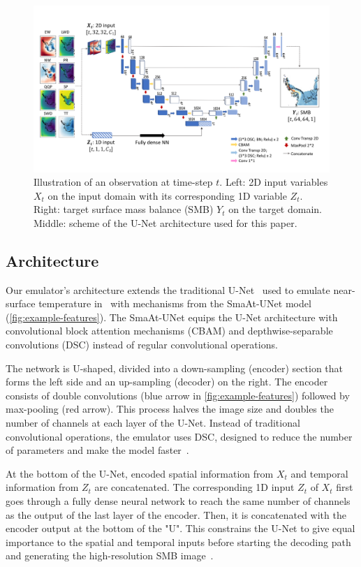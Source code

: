 \documentclass[a4paper,11pt,oneside]{report}
\begin{document}
\begin{figure}[!t]
  \centering
  \includegraphics[width=\columnwidth]{doc/Thesis-latex/images/unet-with-data.pdf}
  \caption []{\small Illustration of an observation at time-step $t$. Left: 2D input variables $X_t$ on the input domain with its corresponding 1D variable $Z_t$. Right: target surface mass balance (SMB) $Y_t$ on the target domain. Middle: scheme of the U-Net architecture used for this paper.}
  \vspace{-3mm}
  \label{fig:example-features}
\end{figure}

\subsection{Architecture}\label{subsec:architecture}
Our emulator's architecture extends the traditional U-Net~\cite{unet} used to emulate near-surface temperature in~\cite{Doury} with mechanisms from the SmaAt-UNet model~\cite{smatunet} (\autoref{fig:example-features}). The SmaAt-UNet equips the U-Net architecture with convolutional block attention mechanisms (CBAM) and depthwise-separable convolutions (DSC) instead of regular convolutional operations.

The network is U-shaped, divided into a down-sampling (encoder) section that forms the left side and an up-sampling (decoder) on the right. The encoder consists of double convolutions (blue arrow in \autoref{fig:example-features}) followed by max-pooling (red arrow). This process halves the image size and doubles the number of channels at each layer of the U-Net. Instead of traditional convolutional operations, the emulator uses DSC, designed to reduce the number of parameters and make the model faster~\cite{smatunet}. 

At the bottom of the U-Net, encoded spatial information from $X_t$ and temporal information from $Z_t$ are concatenated. The corresponding 1D input $Z_t$ of $X_t$ first goes through a fully dense neural network to reach the same number of channels as the output of the last layer of the encoder. Then, it is concatenated with the encoder output at the bottom of the "U". This constrains the U-Net to give equal importance to the spatial and temporal inputs before starting the decoding path and generating the high-resolution SMB image~\cite{Doury}. 
\end{document}
